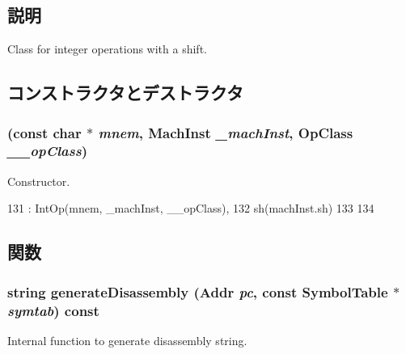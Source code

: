\subsection{説明}
Class for integer operations with a shift. 

\subsection{コンストラクタとデストラクタ}
\hypertarget{classPowerISA_1_1IntShiftOp_a2c5479a977540588d8aa9b83ffd923eb}{
\subsubsection[{IntShiftOp}]{ (const char $\ast$ {\em mnem}, \/  {\bf MachInst} {\em \_\-machInst}, \/  OpClass {\em \_\-\_\-opClass})}}
\label{classPowerISA_1_1IntShiftOp_a2c5479a977540588d8aa9b83ffd923eb}


Constructor. 


\begin{DoxyCode}
131       : IntOp(mnem, _machInst, __opClass),
132         sh(machInst.sh)
133     {
134     }
\end{DoxyCode}


\subsection{関数}
\hypertarget{classPowerISA_1_1IntShiftOp_a3134956ec18bb095818e06eb988f6c55}{
\subsubsection[{generateDisassembly}]{\setlength{\rightskip}{0pt plus 5cm}string generateDisassembly ({\bf Addr} {\em pc}, \/  const SymbolTable $\ast$ {\em symtab}) const}}
\label{classPowerISA_1_1IntShiftOp_a3134956ec18bb095818e06eb988f6c55}
Internal function to generate disassembly string. 

